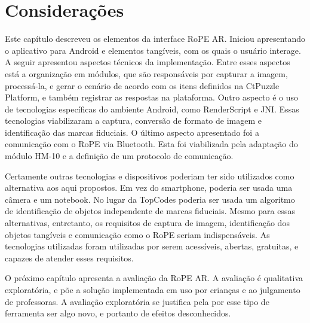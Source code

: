 \section{Considerações}

Este capítulo descreveu os elementos da interface RoPE AR. Iniciou apresentando o aplicativo para Android e elementos tangíveis, com os quais o usuário interage. A seguir apresentou aspectos técnicos da implementação. Entre esses aspectos está a organização em módulos, que são responsáveis por capturar a imagem, processá-la, e gerar o cenário de acordo com os itens definidos na CtPuzzle Platform, e também registrar as respostas na plataforma. Outro aspecto é o uso de tecnologias específicas do ambiente Android, como RenderScript e JNI. Essas tecnologias viabilizaram a captura, conversão de formato de imagem e identificação das marcas fiduciais. O último aspecto apresentado foi a comunicação com o RoPE via Bluetooth. Esta foi viabilizada pela adaptação do módulo HM-10 e a definição de um protocolo de comunicação.

Certamente outras tecnologias e dispositivos poderiam ter sido utilizados como alternativa aos aqui propostos. Em vez do smartphone, poderia ser usada uma câmera e um notebook. No lugar da TopCodes poderia ser usada um algoritmo de identificação de objetos independente de marcas fiduciais. Mesmo para essas alternativas, entretanto, os requisitos de captura de imagem, identificação dos objetos tangíveis e comunicação como o RoPE seriam indispensáveis. As tecnologias utilizadas foram utilizadas por serem acessíveis, abertas, gratuitas, e capazes de atender esses requisitos.


O próximo capítulo apresenta a avaliação da RoPE AR. A avaliação é qualitativa exploratória, e põe a solução implementada em uso por crianças e ao julgamento de professoras. A avaliação exploratória se justifica pela por esse tipo de ferramenta ser algo novo, e portanto de efeitos desconhecidos.